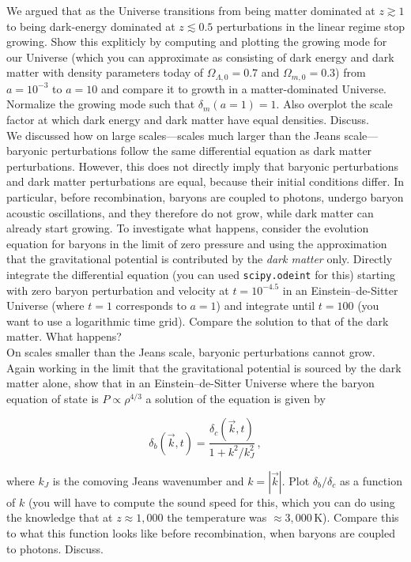 \documentclass[12pt]{article}
\begin{document}
 We argued that as the Universe transitions from
being matter dominated at $z \gtrsim 1$ to being dark-energy dominated
at $z \lesssim 0.5$ perturbations in the linear regime stop
growing. Show this expliticly by computing and plotting the growing
mode for our Universe (which you can approximate as consisting of dark
energy and dark matter with density parameters today of
$\Omega_{\Lambda,0} = 0.7$ and $\Omega_{m,0} = 0.3$) from $a = 10^{-3}$
to $a=10$ and compare it to growth in a matter-dominated
Universe. Normalize the growing mode such that $\delta_m(a=1) =
1$. Also overplot the scale factor at which dark energy and dark
matter have equal densities. Discuss.\\

 We discussed how on large scales---scales much
larger than the Jeans scale---baryonic perturbations follow the same
differential equation as dark matter perturbations. However, this does
not directly imply that baryonic perturbations and dark matter
perturbations are equal, because their initial conditions differ. In
particular, before recombination, baryons are coupled to photons,
undergo baryon acoustic oscillations, and they therefore do not grow,
while dark matter can already start growing. To investigate what
happens, consider the evolution equation for baryons in the limit of
zero pressure and using the approximation that the gravitational
potential is contributed by the \emph{dark matter} only. Directly
integrate the differential equation (you can used
\texttt{scipy.odeint} for this) starting with zero baryon perturbation
and velocity at $t=10^{-4.5}$ in an Einstein--de-Sitter Universe
(where $t=1$ corresponds to $a=1$) and integrate until $t=100$ (you
want to use a logarithmic time grid). Compare the solution to that of
the dark matter. What happens?\\

 On scales smaller than the Jeans scale, baryonic
perturbations cannot grow. Again working in the limit that the
gravitational potential is sourced by the dark matter alone, show that
in an Einstein--de-Sitter Universe where the baryon equation of state
is $P \propto \rho^{4/3}$ a solution of the equation is given by

\begin{equation}
  \delta_b(\vec{k},t) = \frac{\delta_c(\vec{k},t)}{1+k^2/k_J^2}\,,
\end{equation}

where $k_J$ is the comoving Jeans wavenumber and $k = |\vec{k}|$. Plot
$\delta_b/\delta_c$ as a function of $k$ (you will have to compute the
sound speed for this, which you can do using the knowledge that at
$z\approx 1,000$ the temperature was $\approx
3,000\,\mathrm{K}$). Compare this to what this function looks like
before recombination, when baryons are coupled to photons. Discuss.\\
\end{document}
